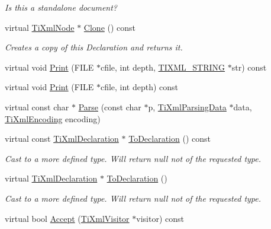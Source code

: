 \begin{DoxyCompactItemize}
\begin{DoxyCompactList}\small\item\em Is this a standalone document? \end{DoxyCompactList}\item 
virtual \hyperlink{class_ti_xml_node}{Ti\+Xml\+Node} $\ast$ \hyperlink{class_ti_xml_declaration_aff8231266d735943d8a7514a9c9822b9}{Clone} () const 
\begin{DoxyCompactList}\small\item\em Creates a copy of this Declaration and returns it. \end{DoxyCompactList}\item 
virtual void \hyperlink{class_ti_xml_declaration_aa5ab32ec19d4eeecff4a9238c6c90565}{Print} (F\+I\+LE $\ast$cfile, int depth, \hyperlink{tinyxml_8h_a92bada05fd84d9a0c9a5bbe53de26887}{T\+I\+X\+M\+L\+\_\+\+S\+T\+R\+I\+NG} $\ast$str) const 
\item 
virtual void \hyperlink{class_ti_xml_declaration_abf6303db4bd05b5be554036817ff1cb4}{Print} (F\+I\+LE $\ast$cfile, int depth) const 
\item 
virtual const char $\ast$ \hyperlink{class_ti_xml_declaration_a9839ea97ed687a2b7342fd7b0f04361b}{Parse} (const char $\ast$p, \hyperlink{class_ti_xml_parsing_data}{Ti\+Xml\+Parsing\+Data} $\ast$data, \hyperlink{tinyxml_8h_a88d51847a13ee0f4b4d320d03d2c4d96}{Ti\+Xml\+Encoding} encoding)
\item 
virtual const \hyperlink{class_ti_xml_declaration}{Ti\+Xml\+Declaration} $\ast$ \hyperlink{class_ti_xml_declaration_a1e085d3fefd1dbf5ccdbff729931a967}{To\+Declaration} () const 
\begin{DoxyCompactList}\small\item\em Cast to a more defined type. Will return null not of the requested type. \end{DoxyCompactList}\item 
virtual \hyperlink{class_ti_xml_declaration}{Ti\+Xml\+Declaration} $\ast$ \hyperlink{class_ti_xml_declaration_a6bd3d1daddcaeb9543c24bfd090969ce}{To\+Declaration} ()
\begin{DoxyCompactList}\small\item\em Cast to a more defined type. Will return null not of the requested type. \end{DoxyCompactList}\item 
virtual bool \hyperlink{class_ti_xml_declaration_ab6a6b178161ba9abc2c35058de689864}{Accept} (\hyperlink{class_ti_xml_visitor}{Ti\+Xml\+Visitor} $\ast$visitor) const 
\end{DoxyCompactItemize}
